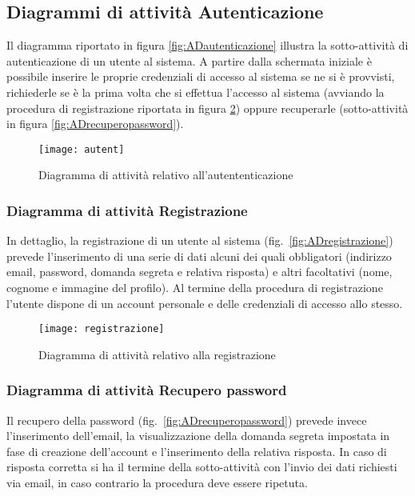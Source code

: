 \subsection{Diagrammi di attività Autenticazione}
Il diagramma riportato in figura \vref{fig:ADautenticazione} illustra la sotto-attività di autenticazione di un utente al sistema. A partire dalla schermata iniziale è possibile inserire le proprie credenziali di accesso al sistema se ne si è provvisti, richiederle se è la prima volta che si effettua l'accesso al sistema (avviando la procedura di registrazione riportata in figura \ref{fig:ADregistrazione}) oppure recuperarle (sotto-attività in figura \vref{fig:ADrecuperopassword}).

\begin{figure}[H]
  \centering
  \texttt{[image: autent]}
  \caption{Diagramma di attività relativo all'autententicazione}\label{fig:ADautenticazione}
\end{figure}

\subsubsection{Diagramma di attività Registrazione}
In dettaglio, la registrazione di un utente al sistema (fig.~\vref{fig:ADregistrazione}) prevede l'inserimento di una serie di dati alcuni dei quali obbligatori (indirizzo email, password, domanda segreta e relativa risposta) e altri facoltativi (nome, cognome e immagine del profilo). Al termine della procedura di registrazione l'utente dispone di un account personale e delle credenziali di accesso allo stesso.

\begin{figure}[H]
  \centering
  \texttt{[image: registrazione]}
  \caption{Diagramma di attività relativo alla registrazione}\label{fig:ADregistrazione}
\end{figure}

\subsubsection{Diagramma di attività Recupero password}
Il recupero della password (fig.~\vref{fig:ADrecuperopassword}) prevede invece l'inserimento dell'email, la visualizzazione della domanda segreta impostata in fase di creazione dell'account e l'inserimento della relativa risposta. In caso di risposta corretta si ha il termine della sotto-attività con l'invio dei dati richiesti via email, in caso contrario la procedura deve essere ripetuta.

